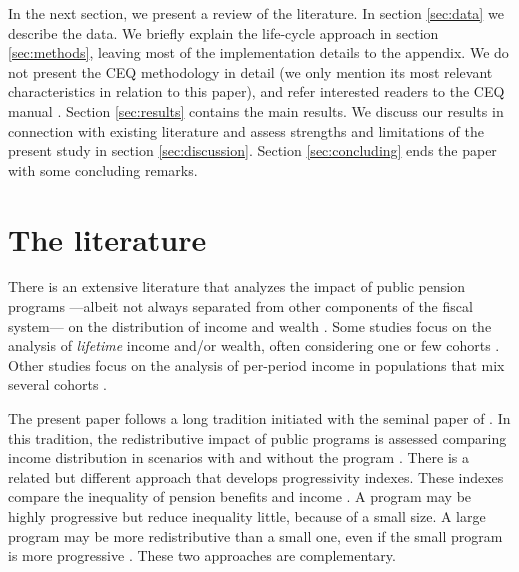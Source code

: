 \documentclass{article}
\begin{document}
  

In the next section, we present a review of the literature. In section \ref{sec:data} we describe the data. We briefly explain the life-cycle approach in section \ref{sec:methods}, leaving most of the implementation details to the appendix. We do not present the CEQ methodology in detail (we only mention its most relevant characteristics in relation to this paper), and refer interested readers to the CEQ manual \parencite{Lustig2022a, Lustig2022b}. Section \ref{sec:results} contains the main results. We discuss our results in connection with existing literature and assess strengths and limitations of the present study in section \ref{sec:discussion}. Section \ref{sec:concluding} ends the paper with some concluding remarks.   

\section{The literature} \label{sec:literature}

There is an extensive literature that analyzes the impact of public pension programs ---albeit not always separated from other components of the fiscal system--- on the distribution of income and wealth \parencite[see, among many others,][]{Lustig2022a, Lustig2022b, Blanchet2021, Breceda2008, Immervoll2008, Goni2011, Lindert2005, Biggs2009, Belloni2019, Wolff2015, Olivera2019, Bonke2019, Coronado2011, Atkinson1995, Ranaldi2022}. 
Some studies focus on the analysis of \textit{lifetime} income and/or wealth, often considering one or few cohorts \parencite[see, among others,][]{Auerbach2022, Coronado2011, Forteza2012, Forteza2014, Moncarz2015, Fajnzylber2012, Zylberstajn2011, Biggs2009, Belloni2019, Wolff2015, Wolff1987, Frick2010, Bonke2019, Feldstein1976, Olivera2019, Feldstein1974a}. Other studies focus on the analysis of per-period income in populations that mix several cohorts \parencite[see, among many others,][]{Lustig2022c, Johnson1999a, McGarry2002, Blanchet2021, Atkinson1995, Piketty2018}.

The present paper follows a long tradition initiated with the seminal paper of \textcite{Musgrave1948}. In this tradition, the redistributive impact of public programs is assessed comparing income distribution in scenarios with and without the program \parencite[see][for a textbook presentation of this approach]{Lambert1993}.  There is a related but different approach that develops progressivity indexes. These indexes compare the inequality of pension benefits and income \parencite{Belloni2019, OECD2009, OECD2013b, Biggs2009}.  A program may be highly progressive but reduce inequality little, because of a small size. A large program may be more redistributive than a small one, even if the small program is more progressive \parencite{Biggs2009}. These two approaches are complementary.
\end{document}
